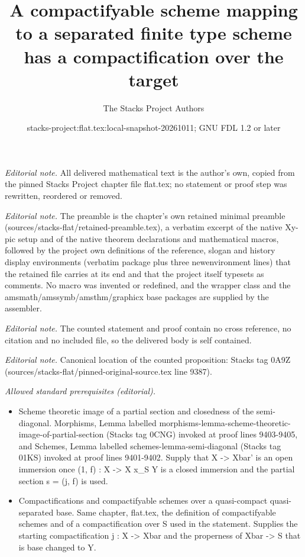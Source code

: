 \documentclass[10pt,a4paper]{amsart}
\title{A compactifyable scheme mapping to a separated finite type scheme has a compactification over the target}
\author{The Stacks Project Authors}
\date{stacks-project:flat.tex:local-snapshot-20261011; GNU FDL 1.2 or later}
\theoremstyle{plain}
\theoremstyle{definition}
\theoremstyle{remark}
\numberwithin{equation}{subsection}
\begin{document}
\maketitle
\noindent\textit{Editorial note.} All delivered mathematical text is the author's own, copied from the pinned Stacks Project chapter file flat.tex; no statement or proof step was rewritten, reordered or removed.\par\medskip
\noindent\textit{Editorial note.} The preamble is the chapter's own retained minimal preamble (sources/stacks-flat/retained-preamble.tex), a verbatim excerpt of the native Xy-pic setup and of the native theorem declarations and mathematical macros, followed by the project own definitions of the reference, slogan and history display environments (verbatim package plus three newenvironment lines) that the retained file carries at its end and that the project itself typesets as comments. No macro was invented or redefined, and the wrapper class and the amsmath/amssymb/amsthm/graphicx base packages are supplied by the assembler.\par\medskip
\noindent\textit{Editorial note.} The counted statement and proof contain no cross reference, no citation and no included file, so the delivered body is self contained.\par\medskip
\noindent\textit{Editorial note.} Canonical location of the counted proposition: Stacks tag 0A9Z (sources/stacks-flat/pinned-original-source.tex line 9387).\par\medskip
\noindent\textit{Allowed standard prerequisites (editorial).}\begin{itemize}
\item Scheme theoretic image of a partial section and closedness of the semi-diagonal. Morphisms, Lemma labelled morphisms-lemma-scheme-theoretic-image-of-partial-section (Stacks tag 0CNG) invoked at proof lines 9403-9405, and Schemes, Lemma labelled schemes-lemma-semi-diagonal (Stacks tag 01KS) invoked at proof lines 9401-9402. Supply that X -> Xbar' is an open immersion once (1, f) : X -> X x\_S Y is a closed immersion and the partial section s = (j, f) is used.
\item Compactifications and compactifyable schemes over a quasi-compact quasi-separated base. Same chapter, flat.tex, the definition of compactifyable schemes and of a compactification over S used in the statement. Supplies the starting compactification j : X -> Xbar and the properness of Xbar -> S that is base changed to Y.
\end{itemize}\medskip
\end{document}
